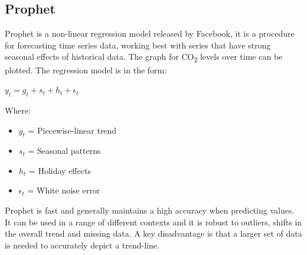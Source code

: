 \documentclass{mcmthesis}
\begin{document}
    \subsection{Prophet}
    Prophet is a non-linear regression model released by Facebook, it is a procedure for forecasting time series data, working best with series that have strong seasonal effects of historical data. The graph for CO\textsubscript{2} levels over time can be plotted. The regression model is in the form:

    ${\displaystyle y_t = g_t + s_t + h_t +\epsilon_t}$

    Where:
    \begin{itemize}
        \item ${g_t}$ = Piecewise-linear trend
        \item ${s_t}$ = Seasonal patterns
        \item ${h_t}$ = Holiday effects
        \item ${\epsilon_t}$ = White noise error
    \end{itemize}

    \begin{center}
    \end{center}

    Prophet is fast and generally maintains a high accuracy when predicting values. It can be used in a range of different contexts and it is robust to outliers, shifts in the overall trend and missing data.  A key disadvantage is that a larger set of data is needed to accurately depict a trend-line.
\end{document}
